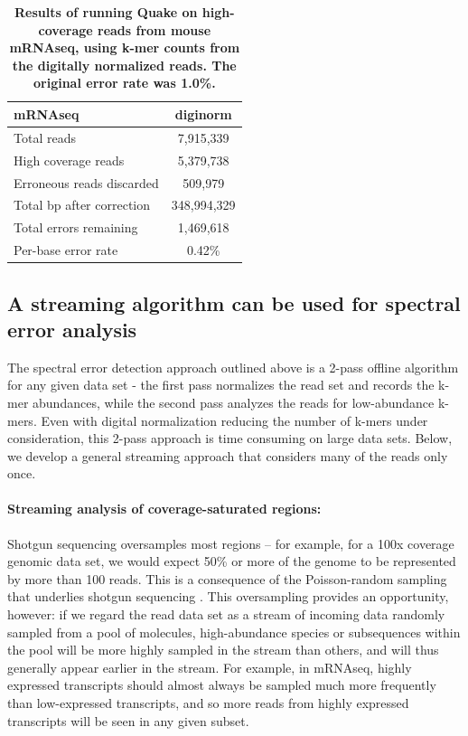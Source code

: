 \documentclass{article}
\begin{document}

\begin{table}
\centering
\begin{tabular}{|l|c|}
\hline
{\bf mRNAseq}                    & diginorm \\
\hline
Total reads                      & 7,915,339 \\
High coverage reads              & 5,379,738 \\
Erroneous reads discarded        & 509,979 \\
Total bp after correction        & 348,994,329 \\
Total errors remaining           & 1,469,618 \\
Per-base error rate              & 0.42\% \\
\hline
\end{tabular}

\caption{{\bf Results of running Quake on high-coverage reads from
    mouse mRNAseq, using k-mer counts from the digitally normalized reads.
    The original error rate was 1.0\%.}}

\label{tab:quake_mrna}
\end{table}

\subsection{A streaming algorithm can be used for spectral error analysis}

The spectral error detection approach outlined above is a 2-pass
offline algorithm for any given data set - the first pass normalizes
the read set and records the k-mer abundances, while the second pass
analyzes the reads for low-abundance k-mers.  Even with digital
normalization reducing the number of k-mers under consideration, this
2-pass approach is time consuming on large data sets.  Below, we
develop a general streaming approach that considers many of the
reads only once.

\paragraph{Streaming analysis of coverage-saturated regions:}

Shotgun sequencing oversamples most regions -- for example, for a 100x
coverage genomic data set, we would expect 50\% or more of the genome
to be represented by more than 100 reads.  This is a consequence of
the Poisson-random sampling that underlies shotgun sequencing \cite{Waterman}.
This oversampling provides an opportunity, however: if we
regard the read data set as a stream of incoming data randomly sampled
from a pool of molecules, high-abundance species or subsequences
within the pool will be more highly sampled in the stream than others,
and will thus generally appear earlier in the stream.  For example, in
mRNAseq, highly expressed transcripts should almost always be
sampled much more frequently than low-expressed transcripts, and so more
reads from highly expressed transcripts will be seen in any given
subset.
\end{document}
